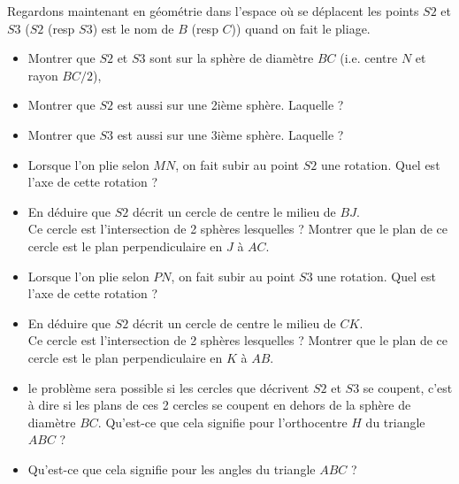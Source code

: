 \documentclass[a4paper,11pt]{book}
\begin{document}
Regardons maintenant en g\'eom\'etrie dans l'espace o\`u se d\'eplacent les 
points $S2$ et $S3$ ($S2$ (resp $S3$) est le nom de $B$ (resp $C$)) quand on 
fait le pliage.\\
\begin{itemize}
\item Montrer que $S2$ et $S3$ sont sur la sph\`ere de diam\`etre $BC$ (i.e. 
centre $N$ et rayon $BC/2$),
\item Montrer que  $S2$ est aussi sur une 2i\`eme sph\`ere. Laquelle ? 
\item Montrer que  $S3$ est aussi sur une 3i\`eme sph\`ere. Laquelle ? 
\item Lorsque l'on plie selon $MN$, on fait subir au point  $S2$ une 
rotation. Quel est l'axe de cette rotation ? 
\item En d\'eduire que  $S2$ d\'ecrit un cercle de centre le milieu de $BJ$.\\
Ce cercle est l'intersection de 2 sph\`eres lesquelles ?
Montrer que le plan de ce cercle est le plan perpendiculaire en $J$ \`a $AC$.
\item Lorsque l'on plie selon $PN$, on fait subir au point  $S3$ une 
rotation. Quel est l'axe de cette rotation ? 
\item En d\'eduire que  $S2$ d\'ecrit un cercle de centre le milieu de $CK$.\\
Ce cercle est l'intersection de 2 sph\`eres lesquelles ?
Montrer que le plan de ce cercle est le plan perpendiculaire en $K$ \`a $AB$.
\item le probl\`eme sera possible si les cercles que d\'ecrivent $S2$ et $S3$ 
se coupent, c'est \`a dire si les plans de ces 2 cercles se coupent en dehors 
de la sph\`ere  de diam\`etre $BC$. Qu'est-ce que cela signifie pour 
l'orthocentre $H$ du triangle $ABC$ ?
\item Qu'est-ce que cela signifie pour les angles du triangle $ABC$ ?
\end{itemize}
\end{document}

